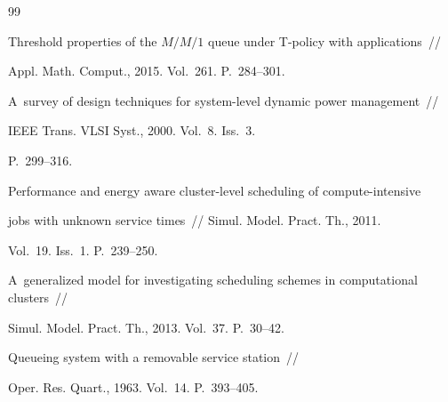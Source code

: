 {\small\frenchspacing

{%


\begin{thebibliography}{99}





Threshold properties of the $M/M/1$ queue under T-policy with applications~/\!\!/ 

Appl. Math. Comput., 2015. Vol.~261. P.~284--301.





A~survey of design techniques for system-level dynamic power management~/\!\!/ 

IEEE Trans. VLSI Syst., 2000. Vol.~8. Iss.~3. 

P.~299--316.









Performance and energy aware cluster-level scheduling of compute-intensive 

jobs with unknown service times~/\!\!/ Simul. Model. Pract. Th., 2011. 

Vol.~19. Iss.~1. P.~239--250.





A~generalized model for investigating scheduling schemes in computational clusters~/\!\!/ 

Simul. Model. Pract. Th., 2013. Vol.~37. P.~30--42.









Queueing system with a removable service station~/\!\!/ 

Oper. Res. Quart., 1963. Vol.~14. P.~393--405.




\end{thebibliography}}}
